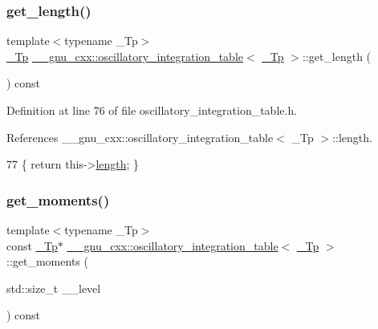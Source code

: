 \subsubsection{\texorpdfstring{get\+\_\+length()}{get\_length()}}
{\footnotesize\ttfamily template$<$typename \+\_\+\+Tp$>$ \\
\hyperlink{namespace____gnu__cxx_a3b19a9c800ca194374ef9172290f7d79}{\+\_\+\+Tp} \hyperlink{struct____gnu__cxx_1_1oscillatory__integration__table}{\+\_\+\+\_\+gnu\+\_\+cxx\+::oscillatory\+\_\+integration\+\_\+table}$<$ \hyperlink{namespace____gnu__cxx_a3b19a9c800ca194374ef9172290f7d79}{\+\_\+\+Tp} $>$\+::get\+\_\+length (\begin{DoxyParamCaption}{ }\end{DoxyParamCaption}) const\hspace{0.3cm}{\ttfamily [inline]}}



Definition at line 76 of file oscillatory\+\_\+integration\+\_\+table.\+h.



References \+\_\+\+\_\+gnu\+\_\+cxx\+::oscillatory\+\_\+integration\+\_\+table$<$ \+\_\+\+Tp $>$\+::length.


\begin{DoxyCode}
77       \{ \textcolor{keywordflow}{return} this->\hyperlink{struct____gnu__cxx_1_1oscillatory__integration__table_ad8654aa233b4878af8d9a99ed61db488}{length}; \}
\end{DoxyCode}
\mbox{\label{struct____gnu__cxx_1_1oscillatory__integration__table_a7bb771c92944e0933bc90d7160cfb5be}} 
\subsubsection{\texorpdfstring{get\+\_\+moments()}{get\_moments()}}
{\footnotesize\ttfamily template$<$typename \+\_\+\+Tp$>$ \\
const \hyperlink{namespace____gnu__cxx_a3b19a9c800ca194374ef9172290f7d79}{\+\_\+\+Tp}$\ast$ \hyperlink{struct____gnu__cxx_1_1oscillatory__integration__table}{\+\_\+\+\_\+gnu\+\_\+cxx\+::oscillatory\+\_\+integration\+\_\+table}$<$ \hyperlink{namespace____gnu__cxx_a3b19a9c800ca194374ef9172290f7d79}{\+\_\+\+Tp} $>$\+::get\+\_\+moments (\begin{DoxyParamCaption}\item[{std\+::size\+\_\+t}]{\+\_\+\+\_\+level }\end{DoxyParamCaption}) const\hspace{0.3cm}{\ttfamily [inline]}}



